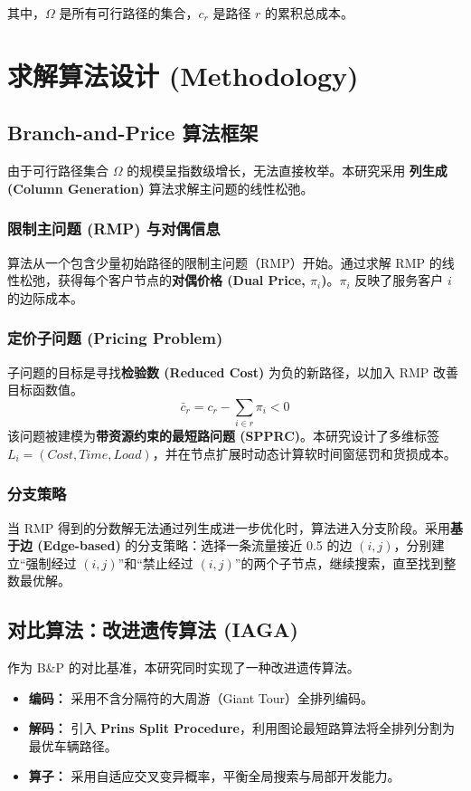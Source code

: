 \documentclass[11pt, a4paper]{article}
\begin{document}
其中，$\Omega$ 是所有可行路径的集合，$c_r$ 是路径 $r$ 的累积总成本。

\section{求解算法设计 (Methodology)}

\subsection{Branch-and-Price 算法框架}
由于可行路径集合 $\Omega$ 的规模呈指数级增长，无法直接枚举。本研究采用 \textbf{列生成 (Column Generation)} 算法求解主问题的线性松弛。

\subsubsection{限制主问题 (RMP) 与对偶信息}
算法从一个包含少量初始路径的限制主问题（RMP）开始。通过求解 RMP 的线性松弛，获得每个客户节点的\textbf{对偶价格 (Dual Price, $\pi_i$)}。$\pi_i$ 反映了服务客户 $i$ 的边际成本。

\subsubsection{定价子问题 (Pricing Problem)}
子问题的目标是寻找\textbf{检验数 (Reduced Cost)} 为负的新路径，以加入 RMP 改善目标函数值。
\begin{equation}
\bar{c}_r = c_r - \sum_{i \in r} \pi_i < 0
\end{equation}
该问题被建模为\textbf{带资源约束的最短路问题 (SPPRC)}。本研究设计了多维标签 $L_i = (Cost, Time, Load)$，并在节点扩展时动态计算软时间窗惩罚和货损成本。

\subsubsection{分支策略}
当 RMP 得到的分数解无法通过列生成进一步优化时，算法进入分支阶段。采用\textbf{基于边 (Edge-based)} 的分支策略：选择一条流量接近 0.5 的边 $(i,j)$，分别建立“强制经过 $(i,j)$”和“禁止经过 $(i,j)$”的两个子节点，继续搜索，直至找到整数最优解。

\subsection{对比算法：改进遗传算法 (IAGA)}
作为 B\&P 的对比基准，本研究同时实现了一种改进遗传算法。
\begin{itemize}
    \item \textbf{编码：} 采用不含分隔符的大周游（Giant Tour）全排列编码。
    \item \textbf{解码：} 引入 \textbf{Prins Split Procedure}，利用图论最短路算法将全排列分割为最优车辆路径。
    \item \textbf{算子：} 采用自适应交叉变异概率，平衡全局搜索与局部开发能力。
\end{itemize}
\end{document}
